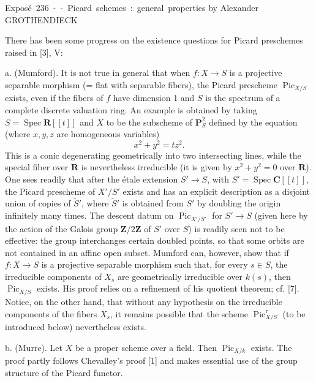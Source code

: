 \unit{Exposé 236 -- Picard schemes: general properties}
%
  {by Alexander GROTHENDIECK}


There has been some progress on the existence questions for Picard preschemes
raised in [3], V:

\medskip
\noindent a. (Mumford). It is not true in general that when
$f:X\longrightarrow S$ is a projective separable morphism (= flat with
separable fibers), the Picard prescheme $\operatorname{Pic}_{X/S}$ exists,
even if the fibers of $f$ have dimension 1 and $S$ is the spectrum of a
complete discrete valuation ring. An example is obtained by taking
$S=\operatorname{Spec}\mathbf R[[t]]$ and $X$ to be the subscheme of
$\mathbf P^2_S$ defined by the equation (where $x,y,z$ are homogeneous
variables)
\[
x^2+y^2=tz^2.
\]
This is a conic degenerating geometrically into two intersecting lines, while
the special fiber over $\mathbf R$ is nevertheless irreducible (it is given by
$x^2+y^2=0$ over $\mathbf R$). One sees readily that after the étale extension
$S'\longrightarrow S$, with $S'=\operatorname{Spec}\mathbf C[[t]]$, the Picard
prescheme of $X'/S'$ exists and has an explicit description as a disjoint union
of copies of $\widetilde S'$, where $\widetilde S'$ is obtained from $S'$ by
doubling the origin infinitely many times. The descent datum on
$\operatorname{Pic}_{X'/S'}$ for $S'\longrightarrow S$ (given here by the
action of the Galois group $\mathbf Z/2\mathbf Z$ of $S'$ over $S$) is readily
seen not to be effective: the group interchanges certain doubled points, so
that some orbits are not contained in an affine open subset. Mumford can,
however, show that if $f:X\longrightarrow S$ is a projective separable
morphism such that, for every $s\in S$, the irreducible components of $X_s$
are geometrically irreducible over $k(s)$, then
$\operatorname{Pic}_{X/S}$ exists. His proof relies on a refinement of his
quotient theorem; cf. [7]. Notice, on the other hand, that without any
hypothesis on the irreducible components of the fibers $X_s$, it remains
possible that the scheme $\operatorname{Pic}^{\tau}_{X/S}$ (to be introduced
below) nevertheless exists.

\noindent b. (Murre). Let $X$ be a proper scheme over a field. Then
$\operatorname{Pic}_{X/k}$ exists. The proof partly follows Chevalley's proof
[1] and makes essential use of the group structure of the Picard functor.

